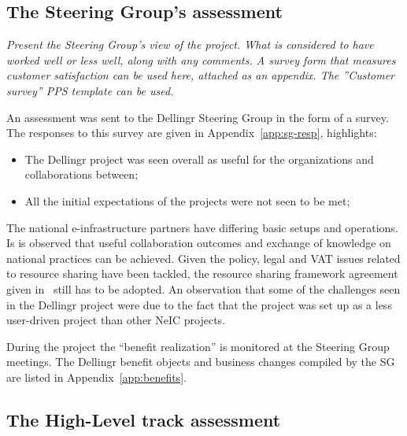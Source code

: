 \documentclass{article}
\newcommand{\dell}{Dellingr\xspace}
\newcommand{\einfra}{e-infrastructure\xspace}
\newcommand{\HLT}{High-Level track\xspace}
\newcommand{\SG}{Steering Group\xspace}
\begin{document}
\subsection{The Steering Group’s assessment}
{\it Present the Steering Group’s view of the project. What is considered to have worked well or less well, along with any comments.  A survey form that measures customer satisfaction can be used here, attached as an appendix. The ”Customer survey” PPS template can be used.}

An assessment was sent to the \dell Steering Group in the form of a survey.
The responses to this survey are given in Appendix~\ref{app:sg-resp}, highlights: %
\begin{itemize}
\item The \dell project was seen overall as useful for the organizations and collaborations between;
\item All the initial expectations of the projects were not seen to be met;
\end{itemize}

The national \einfra partners have differing basic setups and operations.
Is is observed that useful collaboration outcomes and exchange of knowledge on national practices can be achieved.
Given the policy, legal and VAT issues related to resource sharing have been tackled, the resource sharing
framework agreement given in~\cite{dellingr-p2-do5} still has to be adopted.
An observation that some of the challenges seen in the \dell project were due to the fact that the project was set up
as a less user-driven project than other NeIC projects.

During the project the ``benefit realization'' is monitored at the \SG meetings.
The \dell benefit objects and business changes compiled by the SG are listed in Appendix~\ref{app:benefits}.

\subsection{The \HLT assessment}
\end{document}
